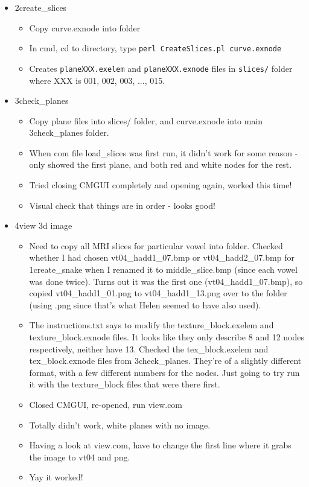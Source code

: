 \documentclass{article}
\begin{document}
\begin{itemize}
\begin{itemize}
        \item 2create\_slices
        \begin{itemize}
            \item Copy curve.exnode into folder
            \item In cmd, cd to directory, type \verb|perl CreateSlices.pl curve.exnode|
            \item Creates \verb|planeXXX.exelem| and \verb|planeXXX.exnode| files in \verb|slices/| folder where XXX is 001, 002, 003, ..., 015.
        \end{itemize}
        
        \item 3check\_planes
        \begin{itemize}
            \item Copy plane files into slices/ folder, and curve.exnode into main 3check\_planes folder.
            \item When com file load\_slices was first run, it didn't work for some reason - only showed the first plane, and both red and white nodes for the rest.
            \item Tried closing CMGUI completely and opening again, worked this time!
            \item Visual check that things are in order - looks good!
        \end{itemize}
        
        \item 4view 3d image
        \begin{itemize}
            \item Need to copy all MRI slices for particular vowel into folder. Checked whether I had chosen vt04\_hadd1\_07.bmp or vt04\_hadd2\_07.bmp for 1create\_snake when I renamed it to middle\_slice.bmp (since each vowel was done twice). Turns out it was the first one (vt04\_hadd1\_07.bmp), so copied vt04\_hadd1\_01.png to vt04\_hadd1\_13.png over to the folder (using .png since that's what Helen seemed to have also used).
            \item The instructions.txt says to modify the texture\_block.exelem and texture\_block.exnode files. It looks like they only describe 8 and 12 nodes respectively, neither have 13. Checked the tex\_block.exelem and tex\_block.exnode files from 3check\_planes. They're of a slightly different format, with a few different numbers for the nodes. Just going to try run it with the texture\_block files that were there first.
            \item Closed CMGUI, re-opened, run view.com
            \item Totally didn't work, white planes with no image.
            \item Having a look at view.com, have to change the first line where it grabs the image to vt04 and png.
            \item Yay it worked! 
        \end{itemize}
        

\end{itemize}
\end{itemize}
\end{document}
